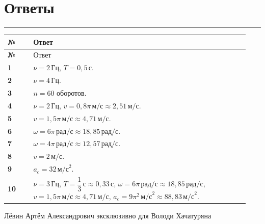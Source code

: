 \documentclass[a4paper,12pt]{article}
\newcommand{\sectionrule}{\par\vspace{0.25em}\noindent\color{accent}\rule{\linewidth}{0.55pt}\color{textgray}\par\vspace{0.25em}}
\newcommand{\Hz}{\,\text{Гц}}
\newcommand{\secnd}{\,\text{с}}
\newcommand{\ms}{\,\text{м/с}}
\newcommand{\mss}{\,\text{м/с}^2}
\newcommand{\rads}{\,\text{рад/с}}
\begin{document}
\section*{Ответы}
\sectionrule
\begin{longtable}{@{}>{\bfseries}p{0.10\linewidth}p{0.84\linewidth}@{}}
\toprule
№ & Ответ \\
\midrule
\endfirsthead
\toprule
№ & Ответ \\
\midrule
\endhead
1 & $\nu=2\Hz$, $T=0{,}5\secnd$. \\
2 & $\nu=4\Hz$. \\
3 & $n=60$ оборотов. \\
4 & $\nu=2\Hz$, $v=0{,}8\pi\ms\approx2{,}51\ms$. \\
5 & $v=1{,}5\pi\ms\approx4{,}71\ms$. \\
6 & $\omega=6\pi\rads\approx18{,}85\rads$. \\
7 & $\omega=4\pi\rads\approx12{,}57\rads$. \\
8 & $v=2\ms$. \\
9 & $a_c=32\mss$. \\
10 & $\nu=3\Hz$, $T=\dfrac13\secnd\approx0{,}33\secnd$, $\omega=6\pi\rads\approx18{,}85\rads$, $v=1{,}5\pi\ms\approx4{,}71\ms$, $a_c=9\pi^2\mss\approx88{,}83\mss$. \\
\bottomrule
\end{longtable}

\vfill
\begin{center}
\small\color{darkaccent}
Лёвин Артём Александрович эксклюзивно для Володи Хачатуряна
\end{center}
\end{document}
